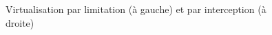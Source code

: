 \begin{figure}[H]
\begin{subfigure}{0.3\textwidth}
  \end{subfigure}
  \caption{Virtualisation par limitation (à gauche) et par interception (à
    droite)}
  \label{TYPE_VIRTUALISATION}
\end{figure}









